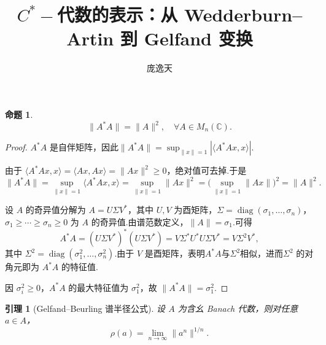 \documentclass{ctexart}
\title{$C^*-\!$代数的表示：从 Wedderburn--Artin 到 Gelfand 变换}
\author{庞逸天}
\newtheorem{lemma}[theorem]{引理}
\newtheorem{proposition}[theorem]{命题}
\theoremstyle{plain}
\newtheorem*{proof}{证明}
\theoremstyle{plain}
\begin{document}
\begin{proposition}
\begin{equation}\label{eq:Cstar-condition-matrix}
    \|A^*A\| = \|A\|^2, \quad \forall A \in M_n(\mathbb{C}).
\end{equation}
\end{proposition}
\begin{proof}


 $A^*A$ 是自伴矩阵，因此$\|A^*A\| = \sup_{\|x\|=1} |\langle A^*A x, x\rangle|.$\par
由于 $\langle A^*A x, x\rangle = \langle Ax, Ax\rangle = \|Ax\|^2 \ge 0$，绝对值可去掉.于是
\begin{equation}\label{eq:Cstar-proof}
    \|A^*A\| = \sup_{\|x\|=1} \langle A^*A x, x\rangle = \sup_{\|x\|=1} \|Ax\|^2 = \bigl(\sup_{\|x\|=1} \|Ax\|\bigr)^2 = \|A\|^2.
\end{equation}

 设 $A$ 的奇异值分解为 $A = U\Sigma V^*$，其中 $U,V$ 为酉矩阵，$\Sigma = \operatorname{diag}(\sigma_1,\dots,\sigma_n)$，$\sigma_1 \ge \cdots \ge \sigma_n \ge 0$ 为 $A$ 的奇异值.由谱范数定义，$\|A\| = \sigma_1$.可得
\begin{equation*}
    A^*A = (U\Sigma V^*)^*(U\Sigma V^*) = V\Sigma^*U^*U\Sigma V^* = V\Sigma^2 V^*,
\end{equation*}
其中 $\Sigma^2 = \operatorname{diag}(\sigma_1^2,\dots,\sigma_n^2)$.由于 $V$ 是酉矩阵，表明$A^*A$与$\Sigma^2$相似，进而$\Sigma^2$ 的对角元即为 $A^*A$ 的特征值.

因 $\sigma_i^2 \ge 0$，$A^*A$ 的最大特征值为 $\sigma_1^2$，故 $\|A^*A\| = \sigma_1^2$.
\end{proof}


\begin{lemma}[Gelfand--Beurling 谱半径公式]\label{lem:spectral-radius-formula}
    设 $A$ 为含幺 Banach 代数，则对任意 $a \in A$，
    \begin{equation}\label{eq:gelfand-beurling}
        \rho(a) = \lim_{n \to \infty} \|a^n\|^{1/n}.
    \end{equation}
\end{lemma}
\end{document}
